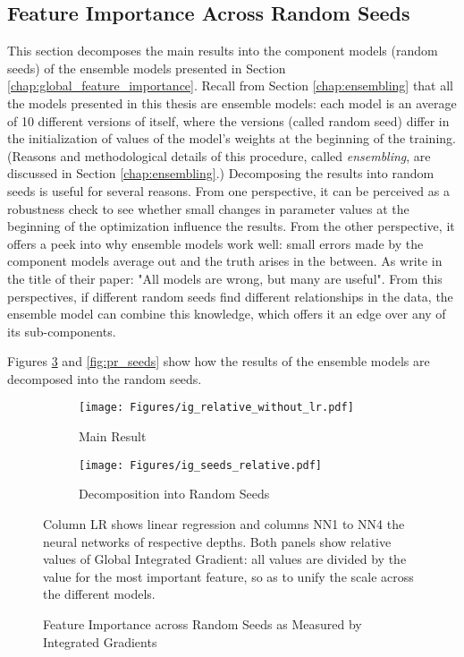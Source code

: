 \subsection{Feature Importance Across Random Seeds}

	This section decomposes the main results into the component models (random seeds) of the ensemble models presented in Section \ref{chap:global_feature_importance}. Recall from Section \ref{chap:ensembling} that all the models presented in this thesis are ensemble models: each model is an average of 10 different versions of itself, where the versions (called random seed) differ in the initialization of values of the model's weights at the beginning of the training. (Reasons and methodological details of this procedure, called \textit{ensembling}, are discussed in Section \ref{chap:ensembling}.) Decomposing the results into random seeds is useful for several reasons. From one perspective, it can be perceived as a robustness check to see whether small changes in parameter values at the beginning of the optimization influence the results. From the other perspective, it offers a peek into why ensemble models work well: small errors made by the component models average out and the truth arises in the between. As \cite{fisher2019all} write in the title of their paper: "All models are wrong, but many are useful". From this perspectives, if different random seeds find different relationships in the data, the ensemble model can combine this knowledge, which offers it an edge over any of its sub-components. 
	
	Figures \ref{fig:ig_seeds} and \ref{fig:pr_seeds} show how the results of the ensemble models are decomposed into the random seeds. 

	\begin{figure}	
		\centering		
		\begin{subfigure}[t]{\textwidth}
			\texttt{[image: Figures/ig\_relative\_without\_lr.pdf]}
			\caption{Main Result}
			\label{fig:ig_seeds_main}
		\end{subfigure}
		
		\begin{subfigure}[t]{\textwidth}
			\centering
			\texttt{[image: Figures/ig\_seeds\_relative.pdf]}
			\caption{Decomposition into Random Seeds}
			\label{fig:ig_seeds_relative}
		\end{subfigure}
		\caption{Feature Importance across Random Seeds as Measured by Integrated Gradients}
		\label{fig:ig_seeds}
		\medskip
		\small
		Column LR shows linear regression and columns NN1 to NN4 the neural networks of respective depths. Both panels show relative values of Global Integrated Gradient: all values are divided by the value for the most important feature, so as to unify the scale across the different models. 
	\end{figure}
	
